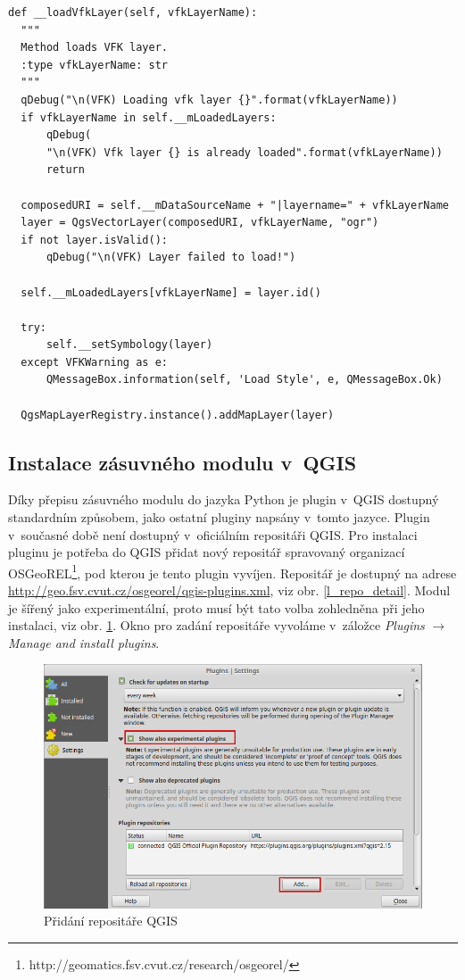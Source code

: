 \documentclass[a4paper,12pt,oneside]{book}
\begin{document}
\newpage
\begin{lstlisting}[style=python, 
		    caption=Kód pro načtení vektorové vrstvy v~jazyce Python,
		    label=l_loadLayerPython]
def __loadVfkLayer(self, vfkLayerName):
  """
  Method loads VFK layer.
  :type vfkLayerName: str
  """
  qDebug("\n(VFK) Loading vfk layer {}".format(vfkLayerName))
  if vfkLayerName in self.__mLoadedLayers:
      qDebug(
	  "\n(VFK) Vfk layer {} is already loaded".format(vfkLayerName))
      return

  composedURI = self.__mDataSourceName + "|layername=" + vfkLayerName
  layer = QgsVectorLayer(composedURI, vfkLayerName, "ogr")
  if not layer.isValid():
      qDebug("\n(VFK) Layer failed to load!")

  self.__mLoadedLayers[vfkLayerName] = layer.id()

  try:
      self.__setSymbology(layer)
  except VFKWarning as e:
      QMessageBox.information(self, 'Load Style', e, QMessageBox.Ok)

  QgsMapLayerRegistry.instance().addMapLayer(layer)
\end{lstlisting}

\subsection{Instalace zásuvného modulu v~QGIS}
Díky přepisu zásuvného modulu do jazyka Python je plugin v~QGIS
dostupný standardním způsobem, jako ostatní pluginy napsány v~tomto
jazyce. Plugin v~současné době není dostupný v~oficiálním repositáři
QGIS. Pro instalaci pluginu je potřeba do QGIS přidat nový repositář
spravovaný organizací
OSGeoREL\footnote{http://geomatics.fsv.cvut.cz/research/osgeorel/},
pod kterou je tento plugin vyvíjen. Repositář je dostupný na adrese
\url{http://geo.fsv.cvut.cz/osgeorel/qgis-plugins.xml}, viz
obr. \ref{l_repo_detail}. Modul je šířený jako experimentální, proto
musí být tato volba zohledněna při jeho instalaci, viz
obr. \ref{l_qgis_plugins}. Okno pro zadání repositáře vyvoláme
v~záložce \textit{Plugins} $\rightarrow$ \textit{Manage and install
  plugins}.

\begin{figure}[htb]
\centering
\includegraphics[width=1\textwidth]{images/qgis_repo_plugins.png}
\caption[Přidání repositáře QGIS]{Přidání repositáře QGIS}
\label{l_qgis_plugins}
\end{figure}
\end{document}
